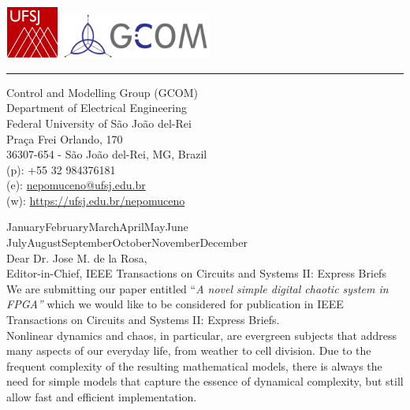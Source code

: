 \documentclass[12pt,arial]{article}
\def\today{\number\day\space\ifcase\month\or
    January\or February\or March\or April\or May\or June\or
    July\or August\or September\or October\or November\or December\fi
    \space\number\year}
\begin{document}
    \noindent
    \includegraphics[height=1.75cm]{ufsj.jpg} \hfill
    \includegraphics[height=1.5cm]{gcom.png}    
    \hrule    
    \begin{flushright}
        \begin{minipage}{5.5cm}
            \scriptsize
            Control and Modelling Group (GCOM)\\
            Department of Electrical Engineering \\
            Federal University of S\~ao Jo\~ao del-Rei \\               
            Pra\c{c}a Frei Orlando, 170\\
            36307-654 - S\~ao Jo\~ao del-Rei, MG, Brazil\\[0.25cm]
            (p): +55 32 984376181\\
            (e): \href{mailto:nepomuceno@ufsj.edu.br}{nepomuceno@ufsj.edu.br}\\
            (w): \href{https://ufsj.edu.br/nepomuceno}{https://ufsj.edu.br/nepomuceno} \\
        \end{minipage}
    \end{flushright}
    \vspace{0.05cm}

    
    \today \\
   
  
    Dear Dr. Jose M. de la Rosa,\\
   Editor-in-Chief, IEEE Transactions on Circuits and Systems II: Express Briefs \\    
      
We are submitting our paper entitled ``\textit{A novel simple digital chaotic system in FPGA''} which we would like to be considered for publication in IEEE Transactions on Circuits and Systems II: Express Briefs.\\

Nonlinear dynamics and chaos, in particular, are evergreen subjects that address many aspects of our everyday life, from weather to cell division. Due to the frequent complexity of the resulting mathematical models, there is always the need for simple models that capture the essence of dynamical complexity, but still allow fast and efficient implementation.\\
\end{document}
